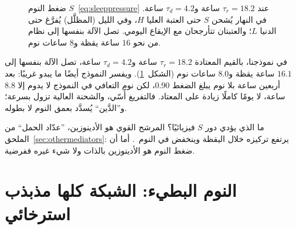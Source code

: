 \begin{figure}[t]
\centering
{}
\caption{ضغط النوم $S$~\eqref{eq:sleeppressure} عند $\tau_r=18.2$ ساعة و$\tau_d=4.2$ ساعة. في النهار يُشحن $S$ حتى العتبة العليا $H$، وفي الليل (المظلَّل) يُفرَّغ حتى الدنيا $L$؛ والعتبتان تتأرجحان مع الإيقاع اليومي. تصل الآلة بنفسها إلى نظام من نحو $16$ ساعة يقظة و$8$ ساعات نوم.}
\label{fig:twoprocess}
\end{figure}

في نموذجنا، بالقيم المعتادة $\tau_r=18.2$ ساعة و$\tau_d=4.2$ ساعة، تصل الآلة بنفسها إلى $16.1$ ساعة يقظة و$8.0$ ساعات نوم (الشكل~\ref{fig:twoprocess}). ويفسر النموذج أيضًا ما يبدو غريبًا: بعد أربعين ساعة بلا نوم يبلغ الضغط $0.90$، لكن نوم التعافي في النموذج لا يدوم إلا $8.8$ ساعة، لا يومًا كاملًا زيادة على المعتاد. فالتفريغ أُسّي، والشحنة العالية تزول بسرعة؛ و”الدَّين“ يُسدَّد بعمق النوم لا بطوله.

ما الذي يؤدي دور $S$ فيزيائيًا؟ المرشح القوي هو الأدينوزين، ”عدّاد الحمل“ من الملحق~\ref{sec:othermediators}: يرتفع تركيزه خلال اليقظة وينخفض في النوم~\cite{PorkkaHeiskanen1997,Dunwiddie2001}. أما أن ضغط النوم هو الأدينوزين بالذات ولا شيء غيره ففرضية.

\section{النوم البطيء: الشبكة كلها مذبذب استرخائي}

